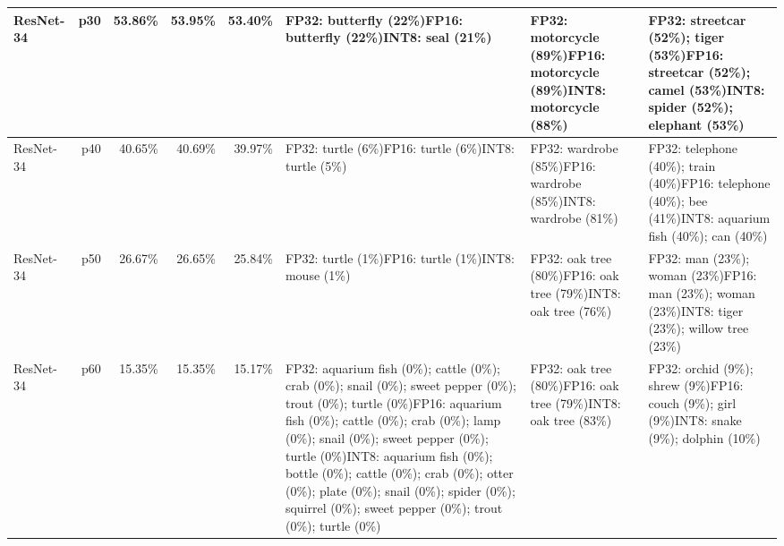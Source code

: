 \begin{longtable}{p{2.8cm} r r r r p{5.0cm} p{4.2cm} p{4.2cm}}
ResNet-34 & p30 & 53.86\% & 53.95\% & 53.40\% & FP32: butterfly (22\%)\newline FP16: butterfly (22\%)\newline INT8: seal (21\%) & FP32: motorcycle (89\%)\newline FP16: motorcycle (89\%)\newline INT8: motorcycle (88\%) & FP32: streetcar (52\%); tiger (53\%)\newline FP16: streetcar (52\%); camel (53\%)\newline INT8: spider (52\%); elephant (53\%) \\ \hline
ResNet-34 & p40 & 40.65\% & 40.69\% & 39.97\% & FP32: turtle (6\%)\newline FP16: turtle (6\%)\newline INT8: turtle (5\%) & FP32: wardrobe (85\%)\newline FP16: wardrobe (85\%)\newline INT8: wardrobe (81\%) & FP32: telephone (40\%); train (40\%)\newline FP16: telephone (40\%); bee (41\%)\newline INT8: aquarium fish (40\%); can (40\%) \\ \hline
ResNet-34 & p50 & 26.67\% & 26.65\% & 25.84\% & FP32: turtle (1\%)\newline FP16: turtle (1\%)\newline INT8: mouse (1\%) & FP32: oak tree (80\%)\newline FP16: oak tree (79\%)\newline INT8: oak tree (76\%) & FP32: man (23\%); woman (23\%)\newline FP16: man (23\%); woman (23\%)\newline INT8: tiger (23\%); willow tree (23\%) \\ \hline
ResNet-34 & p60 & 15.35\% & 15.35\% & 15.17\% & FP32: aquarium fish (0\%); cattle (0\%); crab (0\%); snail (0\%); sweet pepper (0\%); trout (0\%); turtle (0\%)\newline FP16: aquarium fish (0\%); cattle (0\%); crab (0\%); lamp (0\%); snail (0\%); sweet pepper (0\%); turtle (0\%)\newline INT8: aquarium fish (0\%); bottle (0\%); cattle (0\%); crab (0\%); otter (0\%); plate (0\%); snail (0\%); spider (0\%); squirrel (0\%); sweet pepper (0\%); trout (0\%); turtle (0\%) & FP32: oak tree (80\%)\newline FP16: oak tree (79\%)\newline INT8: oak tree (83\%) & FP32: orchid (9\%); shrew (9\%)\newline FP16: couch (9\%); girl (9\%)\newline INT8: snake (9\%); dolphin (10\%) \\ \hline

\end{longtable}
